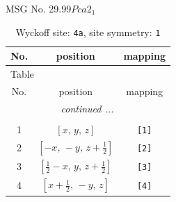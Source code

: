 \documentclass[fleqn,8pt]{jsarticle}
\begin{document}
\setcounter{MaxMatrixCols}{32}

\renewcommand{\tablename}{Table~}
\renewcommand{\figurename}{Figure~}
\begin{center}
\LARGE
MSG No. 29.99\quad$Pca2_{1}$
\end{center}
\renewcommand{\arraystretch}{1.2}
\begin{longtable}{ccc}
\caption{Wyckoff site: {\tt 4a}, site symmetry: {\tt 1}}
 \\
 \hline \hline
No. & position & mapping \\ \hline \endfirsthead

\multicolumn{2}{l}{\tablename\ \thetable{}} \\
 \hline \hline
No. & position & mapping \\ \hline \endhead

 \hline \hline
\multicolumn{2}{r}{\footnotesize\it continued ...} \\ \endfoot

 \hline \hline
\multicolumn{2}{r}{} \\ \endlastfoot

1 & $\left[ x,\, y,\, z \right]$ & {\tt [1]} \\ \hline
2 & $\left[ - x,\, - y,\, z + \frac{1}{2} \right]$ & {\tt [2]} \\ \hline
3 & $\left[ \frac{1}{2} - x,\, y,\, z + \frac{1}{2} \right]$ & {\tt [3]} \\ \hline
4 & $\left[ x + \frac{1}{2},\, - y,\, z \right]$ & {\tt [4]} \\
\end{longtable}
\end{document}
